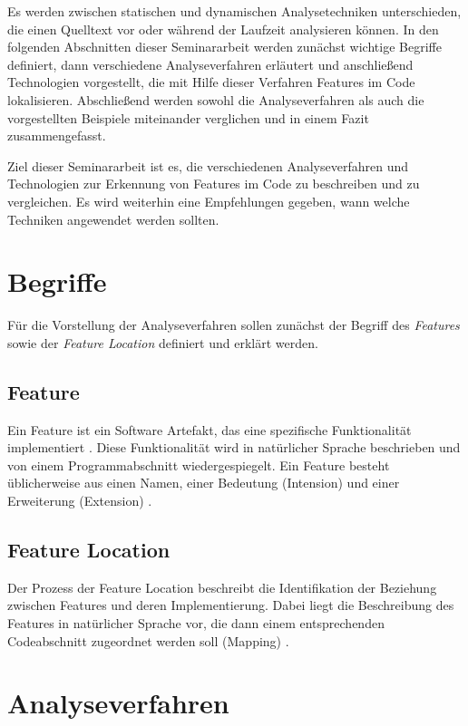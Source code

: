 \documentclass[runningheads,a4paper]{llncs}
\begin{document}
Es werden zwischen statischen und dynamischen Analysetechniken unterschieden, die einen Quelltext vor oder während der Laufzeit analysieren können. In den folgenden Abschnitten dieser Seminararbeit werden zunächst wichtige Begriffe definiert, dann verschiedene Analyseverfahren erläutert und anschließend Technologien vorgestellt, die mit Hilfe dieser Verfahren Features im Code lokalisieren. Abschließend werden sowohl die Analyseverfahren als auch die vorgestellten Beispiele miteinander verglichen und in einem Fazit zusammengefasst.

Ziel dieser Seminararbeit ist es, die verschiedenen Analyseverfahren und Technologien zur Erkennung von Features im Code zu beschreiben und zu vergleichen. Es wird weiterhin eine Empfehlungen gegeben, wann welche Techniken angewendet werden sollten.

\section{Begriffe}

Für die Vorstellung der Analyseverfahren sollen zunächst der Begriff des \textit{Features} sowie der \textit{Feature Location} definiert und erklärt werden.

\subsection*{Feature}
Ein Feature ist ein Software Artefakt, das eine spezifische Funktionalität implementiert \cite{feature}. Diese Funktionalität wird in natürlicher Sprache beschrieben und von einem Programmabschnitt wiedergespiegelt. Ein Feature besteht üblicherweise aus einen Namen, einer Bedeutung (Intension) und einer Erweiterung (Extension) \cite{rajlich-chen}.

\subsection*{Feature Location}
Der Prozess der Feature Location beschreibt die Identifikation der Beziehung zwischen Features und deren Implementierung. Dabei liegt die Beschreibung des Features in natürlicher Sprache vor, die dann einem entsprechenden Codeabschnitt zugeordnet werden soll (Mapping) \cite{survey}.

\section{Analyseverfahren}
\end{document}
